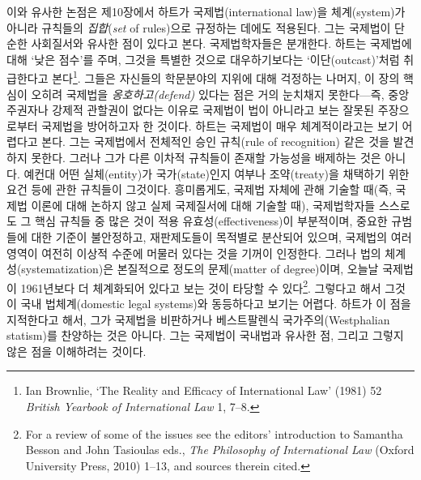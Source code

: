 \documentclass[12pt, oneside]{book}  %
\begin{document}
이와 유사한 논점은 제10장에서 하트가 국제법(international law)을
체계(system)가 아니라 규칙들의 \emph{집합}(\emph{set} of rules)으로
규정하는 데에도 적용된다. 그는 국제법이 단순한 사회질서와 유사한 점이
있다고 본다. 국제법학자들은 분개한다. 하트는 국제법에 대해 `낮은 점수'를
주며, 그것을 특별한 것으로 대우하기보다는 `이단(outcast)'처럼 취급한다고
본다\footnote{Ian Brownlie, `The Reality and Efficacy of International
  Law' (1981) 52 \emph{British Yearbook of International Law} 1, 7--8.}.
그들은 자신들의 학문분야의 지위에 대해 걱정하는 나머지, 이 장의 핵심이
오히려 국제법을 \emph{옹호하고(defend)} 있다는 점은 거의 눈치채지
못한다---즉, 중앙 주권자나 강제적 관할권이 없다는 이유로 국제법이 법이
아니라고 보는 잘못된 주장으로부터 국제법을 방어하고자 한 것이다. 하트는
국제법이 매우 체계적이라고는 보기 어렵다고 본다. 그는 국제법에서
전체적인 승인 규칙(rule of recognition) 같은 것을 발견하지 못한다. 그러나
그가 다른 이차적 규칙들이 존재할 가능성을 배제하는 것은 아니다. 예컨대
어떤 실체(entity)가 국가(state)인지 여부나 조약(treaty)을 채택하기 위한
요건 등에 관한 규칙들이 그것이다. 흥미롭게도, 국제법 자체에 관해 기술할
때(즉, 국제법 이론에 대해 논하지 않고 실제 국제질서에 대해 기술할 때),
국제법학자들 스스로도 그 핵심 규칙들 중 많은 것이 적용
유효성(effectiveness)이 부분적이며, 중요한 규범들에 대한 기준이
불안정하고, 재판제도들이 목적별로 분산되어 있으며, 국제법의 여러 영역이
여전히 이상적 수준에 머물러 있다는 것을 기꺼이 인정한다. 그러나 법의
체계성(systematization)은 본질적으로 정도의 문제(matter of degree)이며,
오늘날 국제법이 1961년보다 더 체계화되어 있다고 보는 것이 타당할 수
있다\footnote{For a review of some of the issues see the editors'
  introduction to Samantha Besson and John Tasioulas eds., \emph{The
  Philosophy of International Law} (Oxford University Press, 2010)
  1--13, and sources therein cited.}. 그렇다고 해서 그것이 국내
법체계(domestic legal systems)와 동등하다고 보기는 어렵다. 하트가 이
점을 지적한다고 해서, 그가 국제법을 비판하거나 베스트팔렌식
국가주의(Westphalian statism)를 찬양하는 것은 아니다. 그는 국제법이
국내법과 유사한 점, 그리고 그렇지 않은 점을 이해하려는 것이다.
\end{document}

